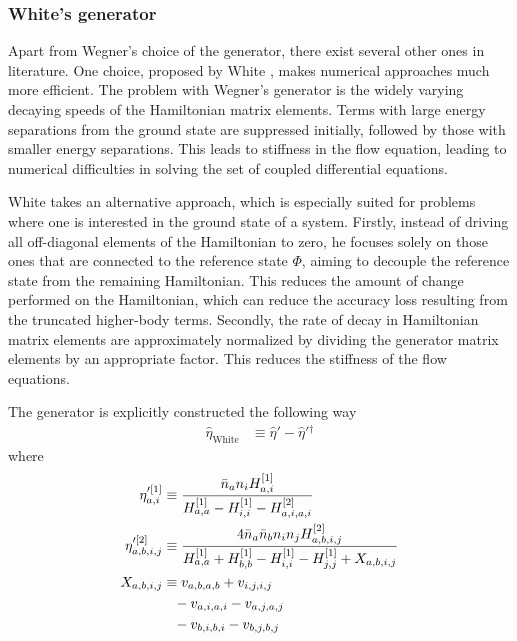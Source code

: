\documentclass[amsmath, amssymb, aps, floatfix, nofootinbib, preprintnumbers,showpacs, superscriptaddress, twocolumn]{revtex4-1}
\begin{document}
\subsubsection{White's generator}

Apart from Wegner's choice of the generator, there exist several other ones in literature. One choice, proposed by White \cite{White:cond-mat0201346}, makes numerical approaches much more efficient.  The problem with Wegner's generator is the widely varying decaying speeds of the Hamiltonian matrix elements.  Terms with large energy separations from the ground state are suppressed initially, followed by those with smaller energy separations.  This leads to stiffness in the flow equation, leading to numerical difficulties in solving the set of coupled differential equations.

White takes an alternative approach, which is especially suited for problems where one is interested in the ground state of a system.  Firstly, instead of driving all off-diagonal elements of the Hamiltonian to zero, he focuses solely on those ones that are connected to the reference state $\Phi$, aiming to decouple the reference state from the remaining Hamiltonian.  This reduces the amount of change performed on the Hamiltonian, which can reduce the accuracy loss resulting from the truncated higher-body terms.  Secondly, the rate of decay in Hamiltonian matrix elements are approximately normalized by dividing the generator matrix elements by an appropriate factor.  This reduces the stiffness of the flow equations.

The generator is explicitly constructed the following way \cite{PhysRevLett.106.222502,White:cond-mat0201346}
\begin{align}
\hat{\eta}_{\text{White}} &\equiv \hat{\eta}' - \hat{\eta}'{}^\dagger
\end{align}
where
\begin{align}
\eta^{\prime [1]}_{a, i} &\equiv \frac{\bar{n}_a n_i H^{[1]}_{a, i}}{H^{[1]}_{a, a} - H^{[1]}_{i, i} - H^{[2]}_{a, i, a, i}}
\label{eq:WhiteFull1} \\
\eta^{\prime [2]}_{a, b, i, j} &\equiv \frac{4 \bar{n}_a \bar{n}_b n_i n_j H^{[2]}_{a, b, i, j}}{H^{[1]}_{a, a} + H^{[1]}_{b, b} - H^{[1]}_{i, i} - H^{[1]}_{j, j} + X_{a, b, i, j}}
\label{eq:WhiteFull2} \\
X_{a, b, i, j}
  &\equiv v_{a, b, a, b} + v_{i, j, i, j} \notag \\
  &\hphantom{\equiv} - v_{a, i, a, i} - v_{a, j, a, j} \notag \\
  &\hphantom{\equiv} - v_{b, i, b, i} - v_{b, j, b, j}
\label{eq:White7}
\end{align}
\end{document}
